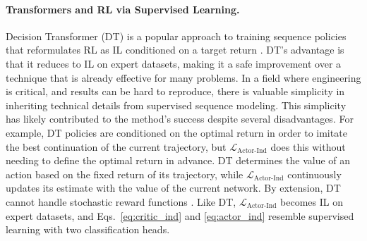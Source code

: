\paragraph{Transformers and RL via Supervised Learning.} Decision Transformer (DT) is a popular approach to training sequence policies that reformulates RL as IL conditioned on a target return \cite{chen2021decision, janner2021reinforcement, lee2022multi}. DT's advantage is that it reduces to IL on expert datasets, making it a safe improvement over a technique that is already effective for many problems. In a field where engineering is critical, and results can be hard to reproduce, there is valuable simplicity in inheriting technical details from supervised sequence modeling. This simplicity has likely contributed to the method's success despite several disadvantages. For example, DT policies are conditioned on the optimal return in order to imitate the best continuation of the current trajectory, but $\mathcal{L}_{\text{Actor-Ind}}$ does this without needing to define the optimal return in advance. DT determines the value of an action based on the fixed return of its trajectory, while $\mathcal{L}_{\text{Actor-Ind}}$ continuously updates its estimate with the value of the current network. By extension, DT cannot handle stochastic reward functions \cite{paster2022you}. Like DT, $\mathcal{L}_{\text{Actor-Ind}}$ becomes IL on expert datasets, and Eqs.~\eqref{eq:critic_ind} and \eqref{eq:actor_ind} resemble supervised learning with two classification heads.